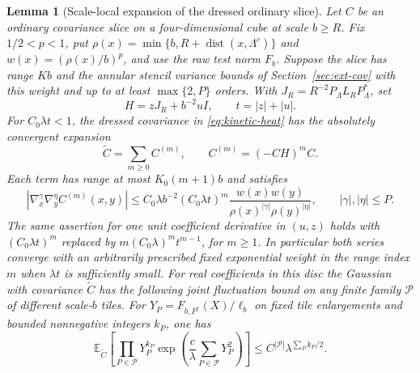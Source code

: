 \documentclass[11pt]{article}
\newtheorem{lemma}[theorem]{Lemma}
\theoremstyle{definition}
\newcommand{\dist}{\operatorname{dist}}
\newcommand{\E}{\mathbb E}
\begin{document}
\begin{lemma}[Scale-local expansion of the dressed ordinary slice]
\label{lem:kinetic-dressed-slice}
Let \(C\) be an ordinary covariance slice on a four-dimensional
cube at scale \(b\ge R\). Fix \(1/2<p<1\), put
\(\rho(x)=\min\{b,R+\dist(x,\Lambda^c)\}\) and
\(w(x)=(\rho(x)/b)^p\), and use the raw test norm \(F_b\).
Suppose the slice has range \(K b\) and the annular stencil
variance bounds of Section~\ref{sec:ext-cov} with this
weight and up to at least \(\max\{2,P\}\) orders. With
\(J_R=R^{-2}P_\Lambda L_RP_\Lambda^*\), set
\begin{equation}
 H=zJ_R+b^{-2}u I,\qquad t=|z|+|u|.
\end{equation}
For \(C_0\lambda t<1\), the dressed covariance in
\eqref{eq:kinetic-heat} has the absolutely convergent expansion
\begin{equation}
 \widetilde C=\sum_{m\ge0} C^{(m)},\qquad
 C^{(m)}=(-CH)^mC.
\end{equation}
Each term has range at most \(K_0(m+1)b\) and satisfies
\begin{equation}
 |\nabla_x^\gamma\nabla_y^\eta C^{(m)}(x,y)|
 \le C_0\lambda b^{-2}(C_0\lambda t)^m
 \frac{w(x)w(y)}{\rho(x)^{|\gamma|}\rho(y)^{|\eta|}},
 \qquad |\gamma|,|\eta|\le P.
 \label{eq:kinetic-dressed-slice}
\end{equation}
The same assertion for one unit coefficient derivative in
\((u,z)\) holds with \((C_0\lambda t)^m\) replaced by
\(m(C_0\lambda)^m t^{m-1}\), for \(m\ge1\).
In particular both series converge with an arbitrarily
prescribed fixed exponential weight in the range index \(m\)
when \(\lambda t\) is sufficiently small. For real coefficients
in this disc the Gaussian with covariance \(\widetilde C\)
has the following joint fluctuation bound on any finite
family \(\mathcal P\) of different scale-\(b\) tiles. For
\(Y_P=F_{b,P^*}(X)/\ell_b\) on fixed tile enlargements
and bounded nonnegative integers \(k_P\), one has
\begin{equation}
 \E_{\widetilde C}\!
    \left[\prod_{P\in\mathcal P}Y_P^{k_P}
            \exp\left(\frac{c}{\lambda}
                         \sum_{P\in\mathcal P}Y_P^2\right)\right]
 \le C^{|\mathcal P|}\lambda^{\sum_P k_P/2}.
\end{equation}
\end{lemma}
\end{document}

